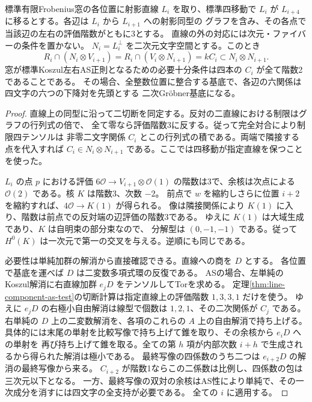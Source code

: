 \begin{theorem}\label{thm:four-shift-line-pbw}
標準有限Frobenius窓の各位置に射影直線 $L_i$ を取り、標準四移動で
$L_i$ が $L_{i+4}$ に移るとする。各辺は $L_i$ から $L_{i+1}$ への射影同型の
グラフを含み、その各点で当該辺の左右の評価階数がともに3とする。
直線の外の対応には次元・ファイバーの条件を置かない。
$N_i=L_i^\perp$ を二次元文字空間とする。このとき
\[
 R_i\cap (N_i\otimes V_{i+1})=R_i\cap(V_i\otimes N_{i+1})
 =k C_i\subset N_i\otimes N_{i+1}.
\]
窓が標準Koszul左右AS正則となるための必要十分条件は四本の $C_i$ が全て階数2であることである。
その場合、全整数位置に整合する基底で、各辺の六関係は四文字の六つの下降対を先頭とする
二次Gröbner基底になる。
\end{theorem}
\begin{proof}
直線上の同型に沿って二切断を同定する。反対の二直線における制限はグラフの行列式の倍で、
全て零なら評価階数3に反する。従って完全対合により制限四テンソルは
非零二文字関係 $C_i$ とこの行列式の積である。両端で隣接する点を代入すれば
$C_i\in N_i\otimes N_{i+1}$ である。ここでは四移動が指定直線を保つことを使った。

$L_i$ の点 $p$ における評価 $6\mathcal O\to V_{i+1}\otimes\mathcal O(1)$
の階数は3で、余核は次点による $\mathcal O(2)$ である。核 $K$ は階数3、次数 $-2$。
前点で $w$ を縮約しさらに位置 $i+2$ を縮約すれば、$4\mathcal O\to K(1)$ が得られる。
像は隣接関係により $K(1)$ に入り、階数は前点での反対端の辺評価の階数3である。
ゆえに $K(1)$ は大域生成であり、$K$ は自明束の部分束なので、
分解型は $(0,-1,-1)$ である。従って $H^0(K)$ は一次元で第一の交叉を与える。逆順にも同じである。

必要性は単純加群の解消から直接確認できる。直線への商を $D$ とする。
各位置で基底を運べば $D$ は二変数多項式環の反復である。
ASの場合、左単純のKoszul解消に右直線加群 $e_jD$ をテンソルしてTorを求める。
定理\ref{thm:line-component-as-test}の切断計算は指定直線上の評価階数 $1,3,3,1$ だけを使う。
ゆえに $e_jD$ の右極小自由解消は線型で個数は $1,2,1$、その二次関係が $C_j$ である。
右単純の $D$ 上の二変数解消を、各項のこれらの $A$ 上の自由解消で持ち上げる。
具体的には末尾の単射を比較写像で持ち上げて錐を取り、その余核から $e_iD$ への単射を
再び持ち上げて錐を取る。全ての第 $h$ 項が内部次数 $i+h$ で生成されるから得られた解消は極小である。
最終写像の四係数のうち二つは $e_{i+2}D$ の解消の最終写像から来る。
$C_{i+2}$ が階数1ならこの二係数は比例し、四係数の包は三次元以下となる。
一方、最終写像の双対の余核はAS性により単純で、その一次成分を消すには四文字の全支持が必要である。
全ての $i$ に適用する。


\end{proof}
